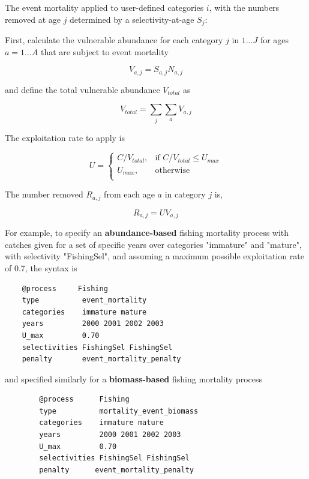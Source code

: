 The event mortality applied to user-defined categories $i$, with the numbers removed at age $j$ determined by a selectivity-at-age $S_j$:

First, calculate the vulnerable abundance for each category $j$ in $1 \ldots J$ for ages $a = 1 \ldots A$ that are subject to event mortality

\begin{equation}
  V_{a,j} = S_{a,j} N_{a,j}
\end{equation}

and define the total vulnerable abundance $V_{total}$ as

\begin{equation}
  V_{total}  = \sum\limits_j {\sum\limits_a {V_{a,j}}}
\end{equation}

The exploitation rate to apply is

\begin{equation}
U = \begin{cases}
  C/V_{total}, & \text{if $C/V_{total} \leq U_{max}$} \\
  U_{max}, & \text{otherwise}\\
  \end{cases}
\end{equation}

The number removed $R_{a,j}$ from each age $a$ in category $j$ is,

\begin{equation}
  R_{a,j} = U V_{a,j}
\end{equation}

For example, to specify an \textbf{abundance-based} fishing mortality process with catches given for a set of specific years over categories "immature" and "mature", with selectivity "FishingSel", and assuming a maximum possible exploitation rate of 0.7, the syntax is

{\small{\begin{verbatim}
	@process     Fishing
	type          event_mortality
	categories    immature mature
	years         2000 2001 2002 2003
	U_max         0.70
	selectivities FishingSel FishingSel
	penalty       event_mortality_penalty
	\end{verbatim}}}

and specified similarly for a \textbf{biomass-based} fishing mortality process

{\small{\begin{verbatim}
		@process      Fishing
		type          mortality_event_biomass
		categories    immature mature
		years         2000 2001 2002 2003
		U_max         0.70
		selectivities FishingSel FishingSel
		penalty      event_mortality_penalty
		\end{verbatim}}}

